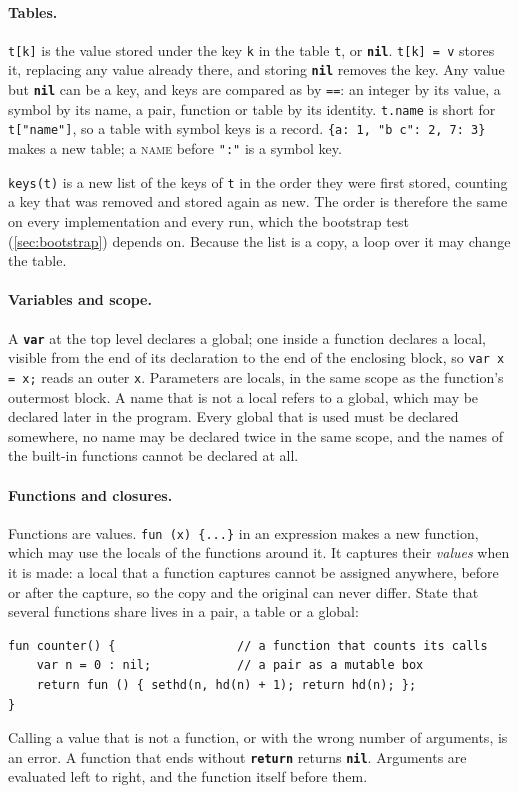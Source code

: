 \documentclass[11pt,a4paper]{article}
\newcommand{\kw}[1]{\textbf{\texttt{#1}}}
\newcommand{\tok}[1]{\texttt{"#1"}}
\begin{document}
\paragraph{Tables.} \verb|t[k]| is the value stored under the key
\verb|k| in the table \verb|t|, or \kw{nil}. \verb|t[k] = v| stores it,
replacing any value already there, and storing \kw{nil} removes the key. Any
value but \kw{nil} can be a key, and keys are compared as by \verb|==|: an
integer by its value, a symbol by its name, a pair, function or table by
its identity. \verb|t.name| is short for \verb|t["name"]|, so a table with
symbol keys is a record. \verb|{a: 1, "b c": 2, 7: 3}| makes a new table; a
\textsc{name} before \tok{:} is a symbol key.

\texttt{keys(t)} is a new list of the keys of \verb|t| in the order they
were first stored, counting a key that was removed and stored again as new.
The order is therefore the same on every implementation and every run, which
the bootstrap test (\cref{sec:bootstrap}) depends on. Because the list is a
copy, a loop over it may change the table.

\paragraph{Variables and scope.} A \kw{var} at the top level declares a
global; one inside a function declares a local, visible from the end of its
declaration to the end of the enclosing block, so \verb|var x = x;| reads an
outer \verb|x|. Parameters are locals, in the same scope as the function's
outermost block. A name that is not a local refers to a global, which may
be declared later in the program. Every global that is used must be declared
somewhere, no name may be declared twice in the same scope, and the names of
the built-in functions cannot be declared at all.

\paragraph{Functions and closures.} Functions are values. \verb|fun (x) {...}|
in an expression makes a new function, which may use the locals of the
functions around it. It captures their \emph{values} when it is made: a
local that a function captures cannot be assigned anywhere, before or after
the capture, so the copy and the original can never differ. State that
several functions share lives in a pair, a table or a global:
\begin{lstlisting}
fun counter() {                 // a function that counts its calls
    var n = 0 : nil;            // a pair as a mutable box
    return fun () { sethd(n, hd(n) + 1); return hd(n); };
}
\end{lstlisting}
Calling a value that is not a function, or with the wrong number of
arguments, is an error. A function that ends without \kw{return} returns
\kw{nil}. Arguments are evaluated left to right, and the function itself
before them.
\end{document}
